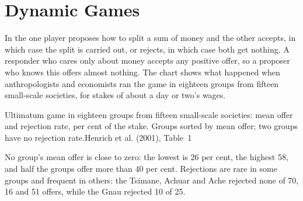 \chapter{Dynamic Games}\label{ch:b2:dynamic-games}

In the  one player proposes how to split a sum of money and the other accepts, in which case
the split is carried out, or rejects, in which case both get nothing. A responder who cares only about
money accepts any positive offer, so a proposer who knows this offers almost nothing. The chart shows what
happened when anthropologists and economists ran the game in eighteen groups from fifteen small-scale
societies, for stakes of about a day or two's wages.

\begin{openingchart}{Ultimatum game in eighteen groups from fifteen small-scale societies: mean offer and
  rejection rate, per cent of the stake. Groups sorted by mean offer; two groups have no rejection
  rate.}{Henrich et al. (2001), Table~1}
\end{openingchart}

No group's mean offer is close to zero: the lowest is 26 per cent, the highest 58, and half the groups offer
more than 40 per cent. Rejections are rare in some groups and frequent in others: the Tsimane, Achuar and
Ache rejected none of 70, 16 and 51 offers, while the Gnau rejected 10 of 25.

